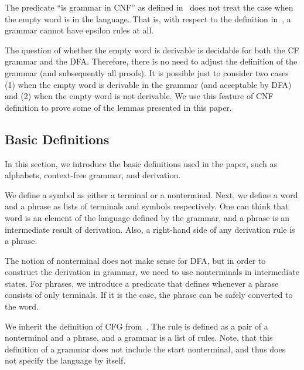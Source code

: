 The predicate ``is grammar in CNF'' as defined in~\cite{smolkaHofmann2016} does not treat the case when the empty word is in the language. That is, with respect to the definition in~\cite{smolkaHofmann2016}, a grammar cannot have epsilon rules at all.

The question of whether the empty word is derivable is decidable for both the CF grammar and the DFA. Therefore, there is no need to adjust the definition of the grammar (and subsequently all proofs). It is possible just to consider two cases (1) when the empty word is derivable in the grammar (and acceptable by DFA) and (2) when the empty word is not derivable. We use this feature of CNF definition to prove some of the lemmas presented in this paper.

\subsection{Basic Definitions}

In this section, we introduce the basic definitions used in the paper, such as alphabets, context-free grammar, and derivation.

We define a symbol as either a terminal or a nonterminal.
Next, we define a word and a phrase as lists of terminals and symbols respectively.
One can think that word is an element of the language defined by the grammar, and a phrase is an intermediate result of derivation.
Also, a right-hand side of any derivation rule is a phrase.


The notion of nonterminal does not make sense for DFA, but in order to construct the derivation in grammar, we need to use nonterminals in intermediate states. For phrases, we introduce a predicate that defines whenever a phrase consists of only terminals. If it is the case, the phrase can be safely converted to the word.

We inherit the definition of CFG from~\cite{smolkaHofmann2016}. The rule is defined as a pair of a nonterminal and a phrase, and a grammar is a list of rules.
Note, that this definition of a grammar does not include the start nonterminal, and thus does not specify the language by itself.

